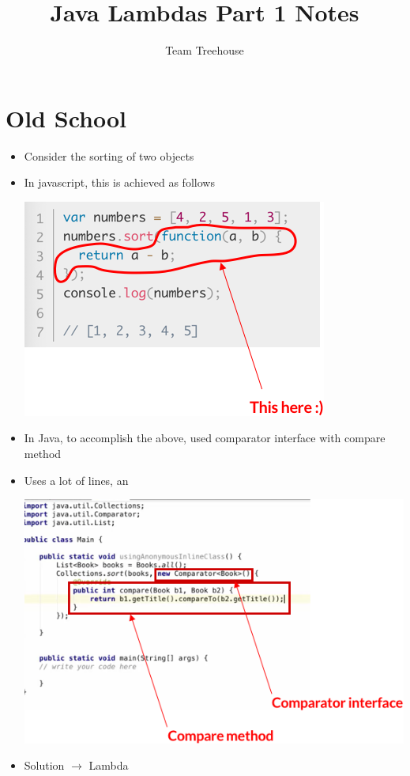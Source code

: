 \documentclass[12pt]{article}
\begin{document}
\title{Java Lambdas Part 1 Notes}
\author{Team Treehouse}
\maketitle

\bigskip

\section{Old School}

\bigskip

\begin{itemize}
    \item Consider the sorting of two objects
    \item In javascript, this is achieved as follows

    \begin{center}
    \includegraphics[width=0.8\linewidth]{images/part_1_notes_1.png}
    \end{center}

    \item In Java, to accomplish the above, used comparator interface with compare method
    \item Uses a lot of lines, an
    \begin{center}
    \includegraphics[width=0.8\linewidth]{images/part_1_notes_2.png}
    \end{center}
    \item Solution $\to$ Lambda
\end{itemize}
\end{document}
